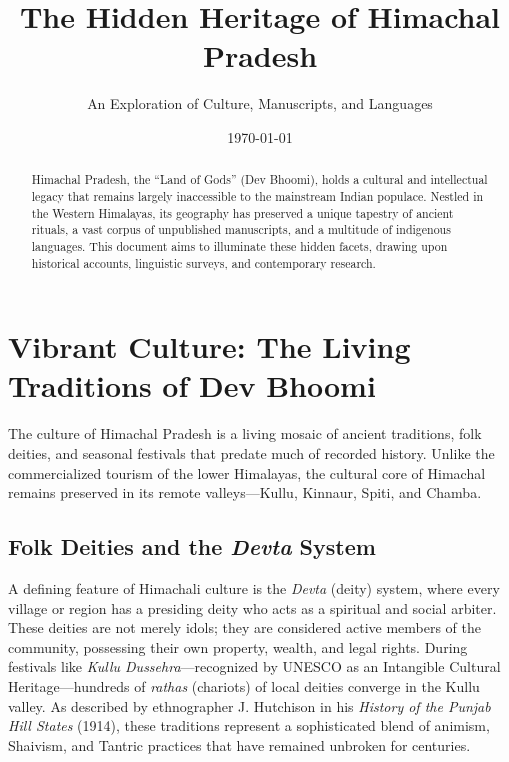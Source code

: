 \documentclass[12pt]{article}
\begin{document}
\title{\textbf{The Hidden Heritage of Himachal Pradesh}}
\author{An Exploration of Culture, Manuscripts, and Languages}
\date{\today}
\maketitle

\begin{abstract}
Himachal Pradesh, the “Land of Gods” (Dev Bhoomi), holds a cultural and intellectual legacy that remains largely inaccessible to the mainstream Indian populace. Nestled in the Western Himalayas, its geography has preserved a unique tapestry of ancient rituals, a vast corpus of unpublished manuscripts, and a multitude of indigenous languages. This document aims to illuminate these hidden facets, drawing upon historical accounts, linguistic surveys, and contemporary research.
\end{abstract}

\section{Vibrant Culture: The Living Traditions of Dev Bhoomi}
The culture of Himachal Pradesh is a living mosaic of ancient traditions, folk deities, and seasonal festivals that predate much of recorded history. Unlike the commercialized tourism of the lower Himalayas, the cultural core of Himachal remains preserved in its remote valleys—Kullu, Kinnaur, Spiti, and Chamba.

\subsection{Folk Deities and the \textit{Devta} System}
A defining feature of Himachali culture is the \textit{Devta} (deity) system, where every village or region has a presiding deity who acts as a spiritual and social arbiter. These deities are not merely idols; they are considered active members of the community, possessing their own property, wealth, and legal rights. During festivals like \textit{Kullu Dussehra}—recognized by UNESCO as an Intangible Cultural Heritage—hundreds of \textit{rathas} (chariots) of local deities converge in the Kullu valley. As described by ethnographer J. Hutchison in his \textit{History of the Punjab Hill States} (1914), these traditions represent a sophisticated blend of animism, Shaivism, and Tantric practices that have remained unbroken for centuries.
\end{document}
